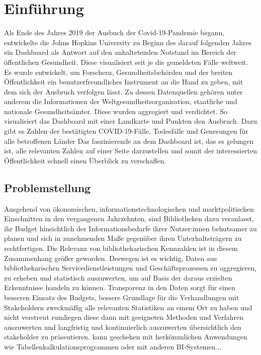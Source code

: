 \chapter{Einführung}
Als Ende des Jahres 2019 der Ausbuch der Covid-19-Pandemie begann, entwickelte die 
Johns Hopkins University zu Beginn des darauf folgenden Jahres ein Dashboard als Antwort
auf den anhaltetenden Notstand im Bereich der öffentlichen Gesundheit. Diese visualisiert seit je
die gemeldeten Fälle weltweit. Es wurde entwickelt, um Forschern, Gesundheitsbehörden und der breiten Öffentlichkeit 
ein benutzerfreundliches Instrument an die Hand zu geben, mit dem sich der Ausbruch verfolgen lässt. 
Zu dessen Datenquellen gehören unter anderem die Informationen der Weltgesundheitsorganisation, staatliche und nationale
Gesundheitsämter. Diese  wurden aggregiert und verdichtet. So visualisiert das Dashboard mit einer Landkarte und Punkten den Ausbruch. 
Dazu gibt es Zahlen der bestätigten COVID-19-Fälle, Todesfälle und Genesungen für alle betroffenen Länder\cite[Vgl.][533]{dong_interactive_2020}
Das faszinierende an dem Dashboard ist, das es gelungen ist, alle relevanten Zahlen auf einer Seite darzustellen
und somit der interessierten Öffentlichkeit schnell einen Überblick zu verschaffen.

\section{Problemstellung}
Ausgehend von ökonomischen, informationstechnologischen und marktpolitischen Einschnitten in den
vergangenen Jahrzehnten, sind Bibliotheken dazu veranlasst, ihr Budget hinsichtlich der Informationsbedarfe
ihrer Nutzer:innen behutsamer zu planen und sich in zunehmenden Maße gegenüber ihren Unterhaltsträgern zu rechtfertigen.
Die Relevanz von bibliothekarischen Kennzahlen ist in diesem Zusammenhang größer geworden.
Deswegen ist es wichtig, Daten aus bibliothekarischen Servicedienstleistungen und Geschäftsprozessen zu aggregieren, zu erheben und statistisch
auszuwerten, um auf Basis der daraus erzielten Erkenntnisse handeln zu können. 
Transparenz in den Daten sorgt für einen besseren Einsatz des Budgets, bessere Grundlage für die Verhandlungen mit Stakeholdern
zweckmäßig alle relevanten Statistiken an einem Ort zu haben und nicht verstreut rumliegen diese dann mit geeigneten 
Methoden und Verfahren auszuwerten und 
langfristig und kontinuierlich auszuwerten
übersichtlich den stakeholder zu präsentieren.
kann geschehen mit herkömmlichen Anwendungen wie Tabellenkalkulationsprogrammen oder mit anderen BI-Systemen...

